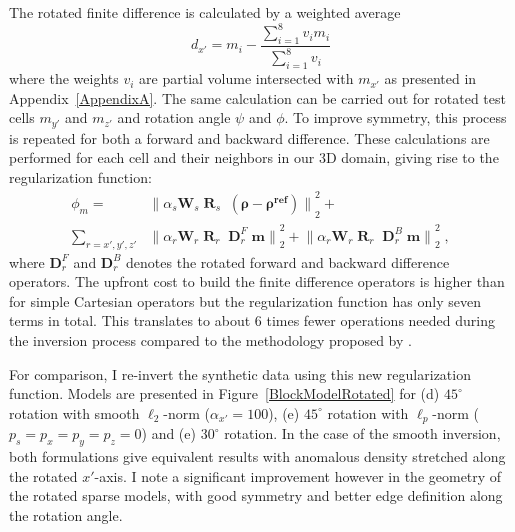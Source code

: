The rotated finite difference is calculated by a weighted average
\begin{equation}
d_{x'} = m_i - \frac{\sum_{i=1}^8 v_i m_i}{\sum_{i=1}^8 v_i}
\end{equation}
where the weights $v_i$ are partial volume intersected with $m_{x'}$ as presented in Appendix~\ref{AppendixA}.
The same calculation can be carried out for rotated test cells $m_{y'}$ and $m_{z'}$ and rotation angle $\psi$ and $\phi$. To improve symmetry, this process is repeated for both a forward and backward difference.
These calculations are performed for each cell and their neighbors in our 3D domain, giving rise to the regularization function:
\begin{equation} \label{phi_m_ROT}
\begin{split}
\phi_m
= &{\|\alpha_s \mathbf{W}_s\;\mathbf{R}_s\; \;( \boldsymbol{\rho - \rho^{ref}})\|}^2_2 + \\
\sum_{r = x',y',z'}& {\|\alpha_r\mathbf{W}_r\;\mathbf{R}_r \; \; \mathbf{D}^F_r \; \mathbf{m}\|}^2_2 + {\|\alpha_r\mathbf{W}_r\;\mathbf{R}_r \; \; \mathbf{D}^B_r \; \mathbf{m}\|}^2_2 \;,
\end{split}
\end{equation}
where $\mathbf{D}^F_r$ and $\mathbf{D}^B_r$ denotes the rotated forward and backward difference operators. The upfront cost to build the finite difference operators is higher than for simple Cartesian operators but the regularization function has only seven terms in total. This translates to about 6 times fewer operations needed during the inversion process compared to the methodology proposed by \cite{PhDLelievre09}.

For comparison, I re-invert the synthetic data using this new regularization function. Models are presented in Figure~\ref{BlockModelRotated} for (d) $45^\circ$ rotation with smooth $\ell_2$-norm ($\alpha_{x'}=100$), (e) $45^\circ$ rotation with $\ell_p$-norm ($p_s=p_x=p_y=p_z=0$) and (e) $30^\circ$ rotation. In the case of the smooth inversion, both formulations give equivalent results with anomalous density stretched along the rotated $x'$-axis. I note a significant improvement however in the geometry of the rotated sparse models, with good symmetry and better edge definition along the rotation angle.

